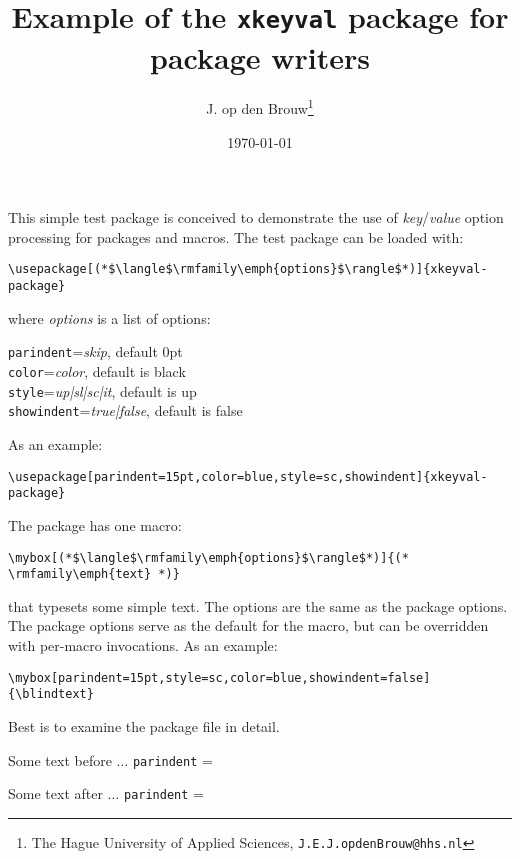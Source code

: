 \documentclass[12pt]{article}
\title{Example of the \texttt{xkeyval} package for package writers}
\author{J. op den Brouw\thanks{The Hague University of Applied Sciences, \texttt{J.E.J.opdenBrouw@hhs.nl}}}
\date{\today}
\begin{document}
\maketitle

This simple test package is conceived to demonstrate the use of \emph{key}/\emph{value} option processing for packages and macros. The test package can be loaded with:

\begin{lstlisting}
\usepackage[(*$\langle$\rmfamily\emph{options}$\rangle$*)]{xkeyval-package}
\end{lstlisting}

where \emph{options} is a list of options:

\texttt{parindent}=\emph{skip}, default 0pt\\
\texttt{color}=\emph{color}, default is black\\
\texttt{style}=\emph{up|sl|sc|it}, default is up\\
\texttt{showindent}=\emph{true|false}, default is false

As an example:

\begin{lstlisting}
\usepackage[parindent=15pt,color=blue,style=sc,showindent]{xkeyval-package}
\end{lstlisting}

The package has one macro:

\begin{lstlisting}
\mybox[(*$\langle$\rmfamily\emph{options}$\rangle$*)]{(* \rmfamily\emph{text} *)}
\end{lstlisting}

that typesets some simple text. The options are the same as the package options. The package options serve as the default for the macro, but can be overridden with per-macro invocations. As an example:
\begin{lstlisting}
\mybox[parindent=15pt,style=sc,color=blue,showindent=false]{\blindtext}
\end{lstlisting}

Best is to examine the package file in detail.

\newpage

\color{orange!80!black}
Some text before $\ldots$ \texttt{parindent} = \the\parindent

\mybox{\blindtext}

\mybox[parindent=100pt,color=red,style=sl]{\blindtext}

\mybox[color=green!20!black]{\blindtext}

\mybox[showindent=false]{\blindtext}

Some text after $\ldots$ \texttt{parindent} = \the\parindent

\newpage
\color{black}


\end{document}
